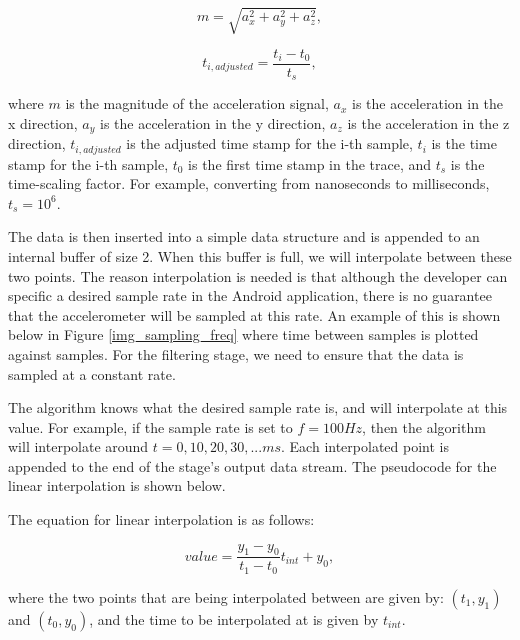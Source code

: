             \begin{equation}
                m = \sqrt{a_{x}^2 + a_{y}^2 + a_{z}^2},
            \end{equation}

            \begin{equation}
                t_{i,adjusted} = \frac{t_i - t_0}{t_s},
            \end{equation}

            where $m$ is the magnitude of the acceleration signal, $a_{x}$ is the acceleration in the x direction, $a_{y}$ is the acceleration in the y direction, $a_{z}$ is the acceleration in the z direction, $t_{i,adjusted}$ is the adjusted time stamp for the i-th sample, $t_i$ is the time stamp for the i-th sample, $t_0$ is the first time stamp in the trace, and $t_s$ is the time-scaling factor. For example, converting from nanoseconds to milliseconds, $t_s = 10^6$. 

            The data is then inserted into a simple data structure and is appended to an internal buffer of size 2. When this buffer is full, we will interpolate between these two points. The reason interpolation is needed is that although the developer can specific a desired sample rate in the Android application, there is no guarantee that the accelerometer will be sampled at this rate. An example of this is shown below in Figure \ref{img_sampling_freq} where time between samples is plotted against samples. For the filtering stage, we need to ensure that the data is sampled at a constant rate.

            The algorithm knows what the desired sample rate is, and will interpolate at this value. For example, if the sample rate is set to $f = 100 Hz$, then the algorithm will interpolate around $t = 0, 10, 20, 30, ... ms$. Each interpolated point is appended to the end of the stage's output data stream. The pseudocode for the linear interpolation is shown below.

            The equation for linear interpolation is as follows:

            \begin{equation}
                value = \frac{y_1 - y_0}{t_1 - t_0} t_{int} + y_0,
            \end{equation}

            where the two points that are being interpolated between are given by: $(t_1, y_1)$ and $(t_0, y_0)$, and the time to be interpolated at is given by $t_{int}$.

